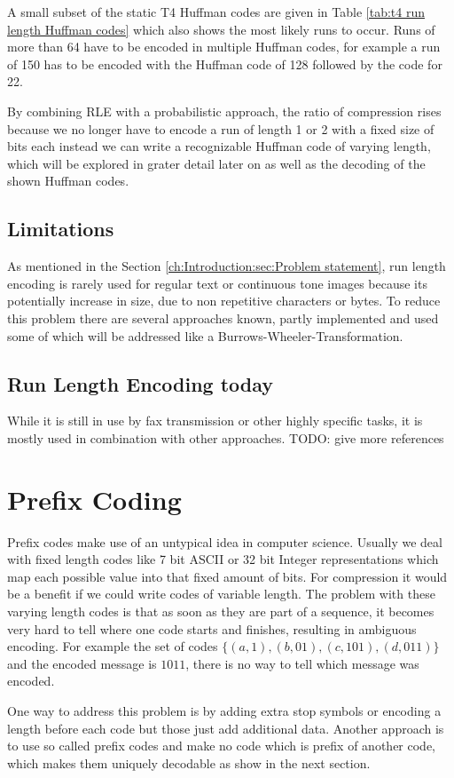 \par{
A small subset of the static T4 Huffman codes are given in Table \ref{tab:t4 run length Huffman
	codes} which also shows the most likely runs to occur. Runs of more than 64 have to be encoded in multiple Huffman codes, for example a run of 150 has to be encoded with the Huffman code of 128 followed by the code for 22.
}
\par{
By combining RLE with a probabilistic approach, the ratio of compression rises because we no longer have to encode a run of length 1 or 2 with a fixed size of bits each instead we can write a recognizable Huffman code of varying length, which will be explored in grater detail later on as well as the decoding of the shown Huffman codes.}

\subsection{Limitations}
\par{
As mentioned in the Section \ref{ch:Introduction:sec:Problem statement}, run length encoding is rarely used for regular text or continuous tone images because its potentially increase in size, due to non repetitive characters or bytes. To reduce this problem there are several approaches known, partly implemented and used some of which will be addressed like a Burrows-Wheeler-Transformation.
}

\subsection{Run Length Encoding today}
\par{
While it is still in use by fax transmission or other highly specific tasks, it is mostly used in combination with other approaches. 
TODO: give more references
}
\section{Prefix Coding}
\label{ch:Principles of compression:sec:Huffman Coding}
\par{
Prefix codes make use of an untypical idea in computer science. Usually we deal with fixed length codes like 7 bit ASCII or 32 bit Integer representations which map each possible value into that fixed amount of bits. For compression it would be a benefit if we could write codes of variable length. The problem with these varying length codes is that as soon as they are part of a sequence, it becomes very hard to tell where one code starts and finishes, resulting in ambiguous encoding. For example the set of codes $ \{(a,1),(b,01),(c,101),(d,011)\}$ and the encoded message is $1011$, there is no way to tell which message was encoded.
}
\par{
One way to address this problem is by adding extra stop symbols or encoding a length before each code but those just add additional data. Another approach is to use so called prefix codes and make no code which is prefix of another code, which makes them uniquely decodable as show in the next section.
}



